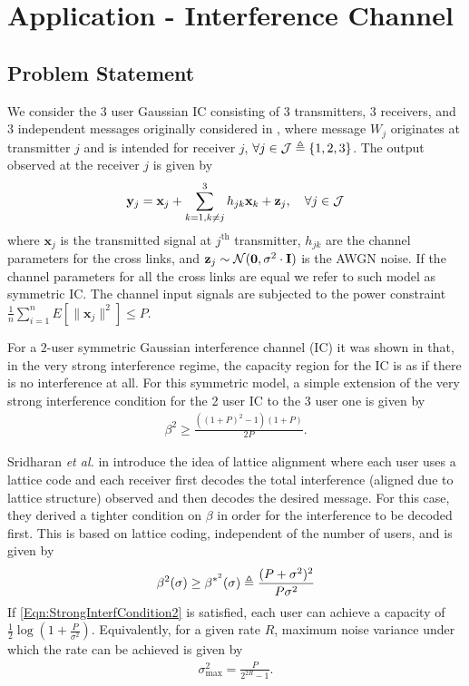 \section{Application - Interference Channel}
\subsection{Problem Statement}
We consider the 3 user Gaussian IC consisting of 3 transmitters, 3 receivers, and 3 independent messages originally considered in \cite{sridharan2008capacity}, where message $W_{j}$ originates at transmitter $j$ and is intended for receiver $j$, $\forall j\in \mathcal{J}\triangleq\{1,2,3\}$. The output observed at the receiver $j$ is given by
\begin{align}\label{SymmInterfChannel}
    \mathbf{y}_{j}=\mathbf{x}_{j}+ \sum^{3}_{k=1,k\neq j}h_{jk}\mathbf{x}_{k}+\mathbf{z}_{j}, \hspace{10pt} \forall j\in \mathcal{J}
\end{align}
where $\mathbf{x}_{j}$ is the transmitted signal at $j^{\text{th}}$ transmitter, $h_{jk}$ are the channel parameters for the cross links, and $\mathbf{z}_{j}\sim\mathcal{N}(\mathbf{0},\sigma^{2}\cdot \mathbf{I})$ is the AWGN noise. If the channel parameters for all the cross links are equal we refer to such model as symmetric IC. The channel input signals are subjected to the power constraint
$\frac{1}{n}\sum_{i=1}^{n}E\left[\|\mathbf{x}_{j}\|^2\right]\leq P$.

For a $2$-user symmetric Gaussian interference channel (IC) it was shown in \cite{carleial1978interference} that, in the very strong interference regime, the capacity region for the IC is as if there is no interference at all. For this symmetric model, a simple extension of the very strong interference condition for the 2 user IC %
to the 3 user one is given by \cite{sridharan2008capacity}
\begin{align}
\beta^{2}\geq \frac{\left((1+P)^{2}-1\right)\left(1+P\right)}{2P}.
\label{Eqn:StrongInterfCondition1}
\end{align}

Sridharan \textit{et al.} in \cite{sridharan2008capacity} introduce the idea of lattice alignment where each user uses a lattice code and each receiver first decodes the total interference (aligned due to lattice structure) observed and then decodes the desired message. For this case, they
derived a tighter condition on $\beta$ in order for the interference to be decoded first. This is based on lattice coding, independent of the number of users, and is given by
\begin{align}
\beta^{2}(\sigma)\geq \beta^{*^{2}}(\sigma)\triangleq\frac{(P+\sigma^{2})^{2}}{P\sigma^{2}}
\label{Eqn:StrongInterfCondition2}
\end{align}
If \eqref{Eqn:StrongInterfCondition2} is satisfied, each user can achieve a capacity \cite{sridharan2008capacity} of
$\frac{1}{2}\log(1+\frac{P}{\sigma^{2}})$. Equivalently, for a given rate $R$, maximum noise variance under which the rate can be achieved is given by
\begin{align}
\sigma^{2}_{\text{max}}=\frac{P}{2^{2R}-1}.
\label{Eqn:SigmaShannon}
\end{align}

